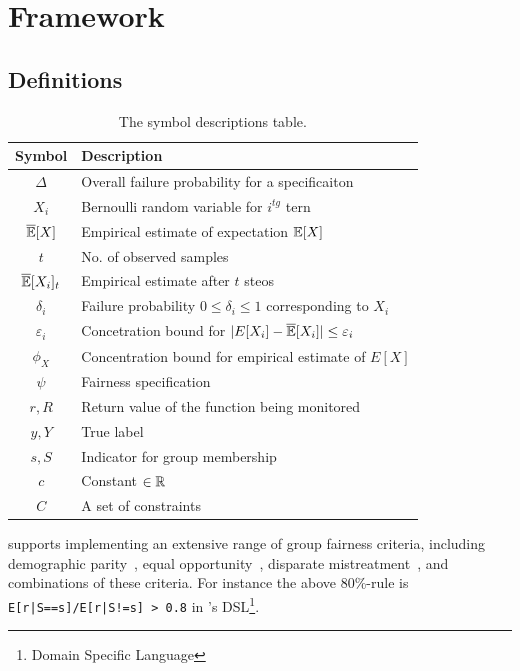 \section{\AVOIRmethodname{} Framework}
\subsection{Definitions}
\begin{table}
    \centering
    \small
    \begin{tabular}{cl}
        \toprule
         \textbf{Symbol} &  \textbf{Description} \\
         \midrule
         $\Delta$ & Overall failure probability for a specificaiton \\
         $X_i$ & Bernoulli random variable for $i^{tg}$ tern\\
         $\overline{\mathbb{E}}[X]$ & Empirical estimate of expectation $\mathbb{E}[X]$\\
         $t$ & No. of observed samples \\
         $\overline{\mathbb{E}}[X_i]_t$ & Empirical estimate after $t$ steos  \\
         $\delta_i$ & Failure probability $0 \leq \delta_i \leq 1$ corresponding  to $X_i$ \\
         $\varepsilon_i$ & Concetration bound for $|E[X_i] - \overline{\mathbb{E}}[X_i]| \leq \varepsilon_i$ \\
         $\phi_X$  & Concentration bound for empirical estimate of $E[X]$ \\
         $\psi$ & Fairness specification\\
         $r, R$ & Return value of the function being monitored\\
         $y, Y$ & True label \\
         $s, S$ & Indicator for group membership \\
         $c$ &  Constant $\in \mathbb{R}$ \\
         $C$ & A set of constraints\\
         \bottomrule
    \end{tabular}%
    \caption{The \AVOIRmethodname{} symbol descriptions table.}
    \label{tab:definitions}
\end{table}
\AVOIRmethodname{} supports implementing an extensive range of group fairness criteria, including demographic parity~\citep{calders2009building}, equal opportunity~\citep{hardt2016equality}, disparate mistreatment~\citep{zafar2017fairness}, and combinations of these criteria. 
For instance the above 80\%-rule is \lstinline{E[r|S==s]/E[r|S!=s] > 0.8} in \AVOIRmethodname{}'s DSL\footnote{Domain Specific Language}.
